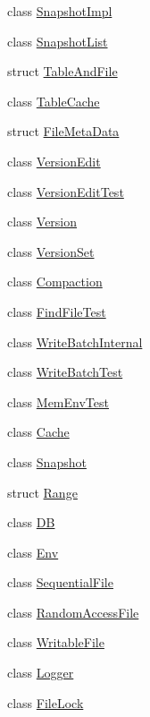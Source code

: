 \begin{DoxyCompactItemize}
\item 
class \hyperlink{classleveldb_1_1_snapshot_impl}{Snapshot\-Impl}
\item 
class \hyperlink{classleveldb_1_1_snapshot_list}{Snapshot\-List}
\item 
struct \hyperlink{structleveldb_1_1_table_and_file}{Table\-And\-File}
\item 
class \hyperlink{classleveldb_1_1_table_cache}{Table\-Cache}
\item 
struct \hyperlink{structleveldb_1_1_file_meta_data}{File\-Meta\-Data}
\item 
class \hyperlink{classleveldb_1_1_version_edit}{Version\-Edit}
\item 
class \hyperlink{classleveldb_1_1_version_edit_test}{Version\-Edit\-Test}
\item 
class \hyperlink{classleveldb_1_1_version}{Version}
\item 
class \hyperlink{classleveldb_1_1_version_set}{Version\-Set}
\item 
class \hyperlink{classleveldb_1_1_compaction}{Compaction}
\item 
class \hyperlink{classleveldb_1_1_find_file_test}{Find\-File\-Test}
\item 
class \hyperlink{classleveldb_1_1_write_batch_internal}{Write\-Batch\-Internal}
\item 
class \hyperlink{classleveldb_1_1_write_batch_test}{Write\-Batch\-Test}
\item 
class \hyperlink{classleveldb_1_1_mem_env_test}{Mem\-Env\-Test}
\item 
class \hyperlink{classleveldb_1_1_cache}{Cache}
\item 
class \hyperlink{classleveldb_1_1_snapshot}{Snapshot}
\item 
struct \hyperlink{structleveldb_1_1_range}{Range}
\item 
class \hyperlink{classleveldb_1_1_d_b}{D\-B}
\item 
class \hyperlink{classleveldb_1_1_env}{Env}
\item 
class \hyperlink{classleveldb_1_1_sequential_file}{Sequential\-File}
\item 
class \hyperlink{classleveldb_1_1_random_access_file}{Random\-Access\-File}
\item 
class \hyperlink{classleveldb_1_1_writable_file}{Writable\-File}
\item 
class \hyperlink{classleveldb_1_1_logger}{Logger}
\item 
class \hyperlink{classleveldb_1_1_file_lock}{File\-Lock}

\end{DoxyCompactItemize}
